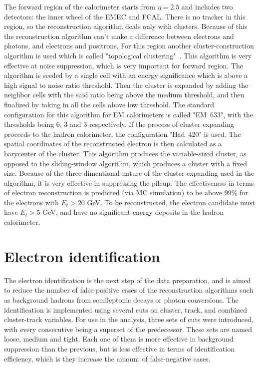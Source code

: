 The forward region of the calorimeter starts from $\eta = 2.5$ and includes two detectors: the inner wheel of the EMEC and FCAL. There is no tracker in this region, so the reconstruction algorithm deals only with clusters. Because of this the reconstruction algorithm can't make a difference between electrons and photons, and electrons and positrons. For this region another cluster-construction algorithm is used which is called "topological clustering"~\cite{lib:elec_reco_fwd}. This algorithm is very effective at noise suppression, which is very important for forward region. The algorithm is seeded by a single cell with an energy significance which is above a high signal to noise ratio threshold. Then the cluster is expanded by adding the neighbor cells with the said ratio being above the medium threshold, and then finalized by taking in all the cells above low threshold. The standard configuration for this algorithm for EM calorimeters is called "EM~633", with the thresholds being 6, 3 and 3 respectively. If the process of cluster expanding proceeds to the hadron calorimeter, the configuration "Had~420" is used. The spatial coordinates of the reconstructed electron is then calculated as a barycenter of the cluster. This algorithm produces the variable-sized cluster, as opposed to the sliding-window algorithm, which produces a cluster with a fixed size. Because of the three-dimentional nature of the cluster expanding used in the algorithm, it is very effective in suppressing the pileup. The effectiveness in terms of electron reconstruction is predicted (via MC simulation) to be above 99\% for the electrons with $E_{t} > 20$ GeV. To be reconstructed, the electron candidate must have $E_{t} > 5$ GeV, and have no significant energy deposits in the hadron calorimeter.

\section{Electron identification}
\label{sec:Rec_elecID}

The electron identification is the next step of the data preparation, and is aimed to reduce the number of false-positive cases of the reconstruction algorithms such as background hadrons from semileptonic decays or photon conversions. The identification is implemented using several cuts on cluster, track, and combined cluster-track variables. For use in the analysis, three sets of cuts were introduced, with every consecutive being a superset of the predecessor. These sets are named loose, medium and tight. Each one of them is more effective in background suppression than the previous, but is less effective in terms of identification efficiency, which is they increase the amount of false-negative cases.

